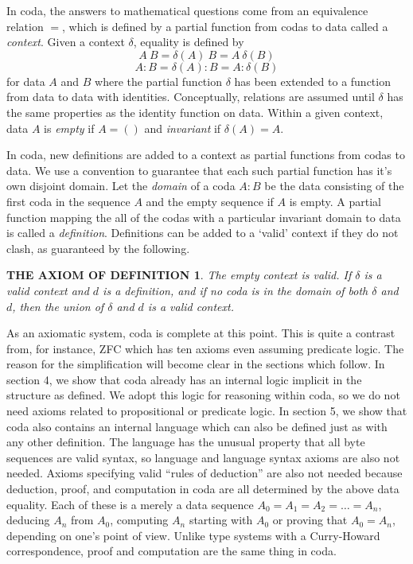 \documentclass[11pt]{article}
\begin{document}
     In coda, the answers to mathematical questions come from an equivalence relation $=$, which is defined by a partial function from codas to data
called a {\it context}.  Given a context $\delta$, equality is defined by
\begin{equation} \label{eqn}
	A\ B = \delta(A)\ B = A\ \delta(B)
\end{equation}
\begin{equation} \label{eqn}
	A:B = \delta(A):B = A:\delta(B)
\end{equation}
for data $A$ and $B$ where the partial function $\delta$ has been extended to a function from data to data with identities.
Conceptually, relations are assumed until $\delta$ has the same properties as the identity function on data.  Within a given context, data $A$ is {\it empty} if $A=()$ and {\it invariant}
if $\delta(A)=A$.

     In coda, new definitions are added to a context as partial functions from codas to data.  We use a convention to guarantee that each such partial
function has it's own disjoint domain.  Let the {\it domain} of a coda $A:B$ be the data consisting of the first coda in the sequence $A$ and the empty
sequence if $A$ is empty.  A partial function mapping the all of the codas with a particular invariant domain to data is called a {\it definition}.  Definitions
can be added to a `valid' context if they do not clash, as guaranteed by the following. 

\newtheorem*{remark}{THE AXIOM OF DEFINITION}
\begin{remark}  The empty context is valid.  If $\delta$ is a valid context and $d$ is a definition, and if no coda is in
the domain of both $\delta$ and $d$, then the union of $\delta$ and $d$ is a valid context.
\end{remark}
\noindent As an axiomatic system, coda is complete at this point.  This is quite a contrast from, for instance, ZFC which has ten axioms 
even assuming predicate logic.  The reason for the simplification will become clear in the sections which follow.  In section 4, we show 
that coda already has an internal logic implicit in the structure as defined.  We adopt this logic for reasoning within coda, so we do not 
need axioms related to propositional or predicate logic.  In section 5, we show that coda also contains an internal language which can 
also be defined just as with any other definition.  The language has the unusual property that all byte sequences are valid syntax, 
so language and language syntax axioms are also not needed.  Axioms specifying valid ``rules of deduction'' are also not needed 
because deduction, proof, and computation in coda are all determined by the above data equality.  Each of these is a merely a data sequence $A_0=A_1=A_2=\dots=A_n$, 
deducing $A_n$ from $A_0$, computing $A_n$ starting with $A_0$ or proving that $A_0=A_n$, depending on one's point of view.  
Unlike type systems with a Curry-Howard correspondence, proof and computation are the same thing in coda. 
\end{document}
